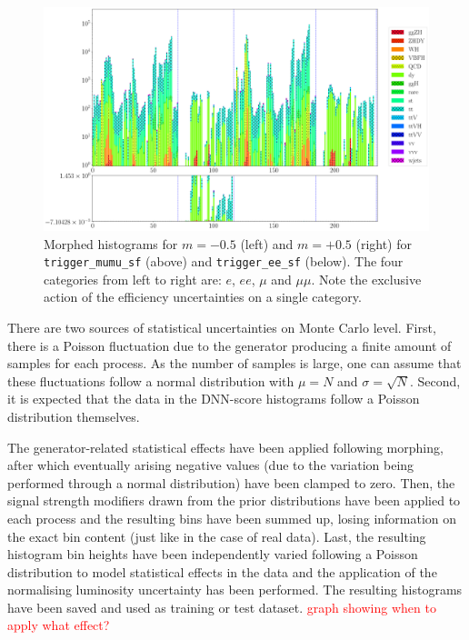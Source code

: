 \begin{figure}[h!]
\begin{minipage}{.5\textwidth}
		\includegraphics[width=\linewidth]{figures/network_setup/trigger_ee_sf_+0.5}
	\end{minipage}
	\caption{Morphed histograms for $m = -0.5$ (left) and $m = +0.5$ (right) for \texttt{trigger\_mumu\_sf} (above) and \texttt{trigger\_ee\_sf} (below). The four categories from left to right are: $e$, $ee$, $\mu$ and $\mu\mu$. Note the exclusive action of the efficiency uncertainties on a single category.}
	\label{fig:trigger_sf}
\end{figure}

\Subsection{\textcolor{red}{Statistical Uncertainties}}

There are two sources of statistical uncertainties on Monte Carlo level. First, there is a Poisson fluctuation due to the generator producing a finite amount of samples for each process. As the number of samples is large, one can assume that these fluctuations follow a normal distribution with $\mu = N$ and $\sigma = \sqrt{N}$. Second, it is expected that the data in the DNN-score histograms follow a Poisson distribution themselves.

The generator-related statistical effects have been applied following morphing, after which eventually arising negative values (due to the variation being performed through a normal distribution) have been clamped to zero. Then, the signal strength modifiers drawn from the prior distributions have been applied to each process and the resulting bins have been summed up, losing information on the exact bin content (just like in the case of real data). Last, the resulting histogram bin heights have been independently varied following a Poisson distribution to model statistical effects in the data and the application of the normalising luminosity uncertainty has been performed. The resulting histograms have been saved and used as training or test dataset.
\textcolor{red}{graph showing when to apply what effect?}

